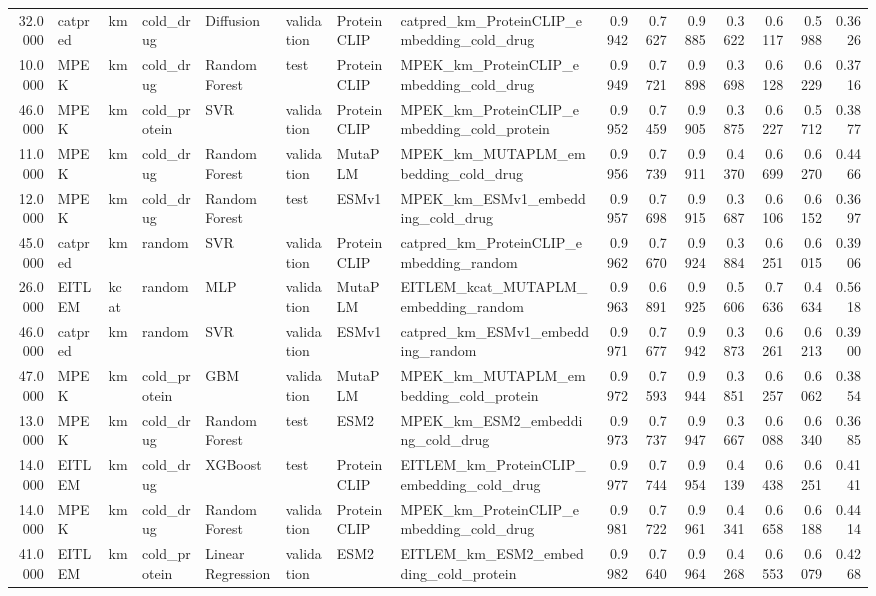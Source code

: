 \begin{tabular}{rlllllllrrrrrrr}
32.0000 & catpred & km & cold_drug & Diffusion & validation & ProteinCLIP & catpred_km_ProteinCLIP_embedding_cold_drug & 0.9942 & 0.7627 & 0.9885 & 0.3622 & 0.6117 & 0.5988 & 0.3626 \\
10.0000 & MPEK & km & cold_drug & Random Forest & test & ProteinCLIP & MPEK_km_ProteinCLIP_embedding_cold_drug & 0.9949 & 0.7721 & 0.9898 & 0.3698 & 0.6128 & 0.6229 & 0.3716 \\
46.0000 & MPEK & km & cold_protein & SVR & validation & ProteinCLIP & MPEK_km_ProteinCLIP_embedding_cold_protein & 0.9952 & 0.7459 & 0.9905 & 0.3875 & 0.6227 & 0.5712 & 0.3877 \\
11.0000 & MPEK & km & cold_drug & Random Forest & validation & MutaPLM & MPEK_km_MUTAPLM_embedding_cold_drug & 0.9956 & 0.7739 & 0.9911 & 0.4370 & 0.6699 & 0.6270 & 0.4466 \\
12.0000 & MPEK & km & cold_drug & Random Forest & test & ESMv1 & MPEK_km_ESMv1_embedding_cold_drug & 0.9957 & 0.7698 & 0.9915 & 0.3687 & 0.6106 & 0.6152 & 0.3697 \\
45.0000 & catpred & km & random & SVR & validation & ProteinCLIP & catpred_km_ProteinCLIP_embedding_random & 0.9962 & 0.7670 & 0.9924 & 0.3884 & 0.6251 & 0.6015 & 0.3906 \\
26.0000 & EITLEM & kcat & random & MLP & validation & MutaPLM & EITLEM_kcat_MUTAPLM_embedding_random & 0.9963 & 0.6891 & 0.9925 & 0.5606 & 0.7636 & 0.4634 & 0.5618 \\
46.0000 & catpred & km & random & SVR & validation & ESMv1 & catpred_km_ESMv1_embedding_random & 0.9971 & 0.7677 & 0.9942 & 0.3873 & 0.6261 & 0.6213 & 0.3900 \\
47.0000 & MPEK & km & cold_protein & GBM & validation & MutaPLM & MPEK_km_MUTAPLM_embedding_cold_protein & 0.9972 & 0.7593 & 0.9944 & 0.3851 & 0.6257 & 0.6062 & 0.3854 \\
13.0000 & MPEK & km & cold_drug & Random Forest & test & ESM2 & MPEK_km_ESM2_embedding_cold_drug & 0.9973 & 0.7737 & 0.9947 & 0.3667 & 0.6088 & 0.6340 & 0.3685 \\
14.0000 & EITLEM & km & cold_drug & XGBoost & test & ProteinCLIP & EITLEM_km_ProteinCLIP_embedding_cold_drug & 0.9977 & 0.7744 & 0.9954 & 0.4139 & 0.6438 & 0.6251 & 0.4141 \\
14.0000 & MPEK & km & cold_drug & Random Forest & validation & ProteinCLIP & MPEK_km_ProteinCLIP_embedding_cold_drug & 0.9981 & 0.7722 & 0.9961 & 0.4341 & 0.6658 & 0.6188 & 0.4414 \\
41.0000 & EITLEM & km & cold_protein & Linear Regression & validation & ESM2 & EITLEM_km_ESM2_embedding_cold_protein & 0.9982 & 0.7640 & 0.9964 & 0.4268 & 0.6553 & 0.6079 & 0.4268 \\

\end{tabular}
